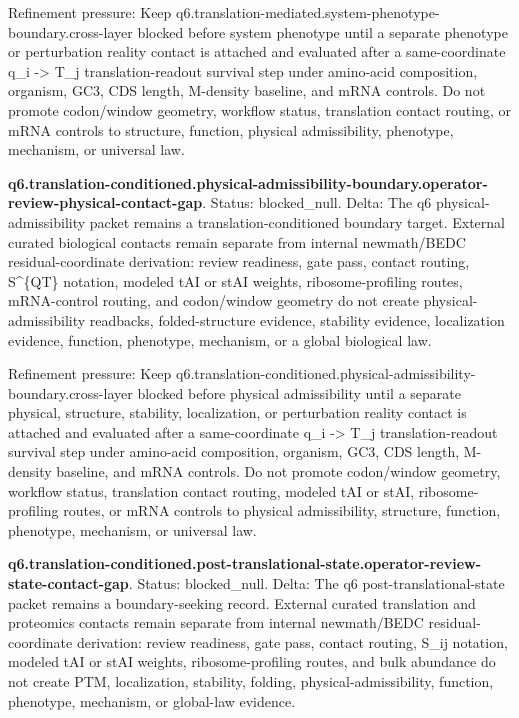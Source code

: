 Refinement pressure: Keep q6.translation-mediated.system-phenotype-boundary.cross-layer blocked before system phenotype until a separate phenotype or perturbation reality contact is attached and evaluated after a same-coordinate q\_i -> T\_j translation-readout survival step under amino-acid composition, organism, GC3, CDS length, M-density baseline, and mRNA controls. Do not promote codon/window geometry, workflow status, translation contact routing, or mRNA controls to structure, function, physical admissibility, phenotype, mechanism, or universal law.

\textbf{q6.translation-conditioned.physical-admissibility-boundary.operator-review-physical-contact-gap}. Status: blocked\_null. Delta: The q6 physical-admissibility packet remains a translation-conditioned boundary target. External curated biological contacts remain separate from internal newmath/BEDC residual-coordinate derivation: review readiness, gate pass, contact routing, S\textasciicircum{}\{QT\} notation, modeled tAI or stAI weights, ribosome-profiling routes, mRNA-control routing, and codon/window geometry do not create physical-admissibility readbacks, folded-structure evidence, stability evidence, localization evidence, function, phenotype, mechanism, or a global biological law.

Refinement pressure: Keep q6.translation-conditioned.physical-admissibility-boundary.cross-layer blocked before physical admissibility until a separate physical, structure, stability, localization, or perturbation reality contact is attached and evaluated after a same-coordinate q\_i -> T\_j translation-readout survival step under amino-acid composition, organism, GC3, CDS length, M-density baseline, and mRNA controls. Do not promote codon/window geometry, workflow status, translation contact routing, modeled tAI or stAI, ribosome-profiling routes, or mRNA controls to physical admissibility, structure, function, phenotype, mechanism, or universal law.

\textbf{q6.translation-conditioned.post-translational-state.operator-review-state-contact-gap}. Status: blocked\_null. Delta: The q6 post-translational-state packet remains a boundary-seeking record. External curated translation and proteomics contacts remain separate from internal newmath/BEDC residual-coordinate derivation: review readiness, gate pass, contact routing, S\_ij notation, modeled tAI or stAI weights, ribosome-profiling routes, and bulk abundance do not create PTM, localization, stability, folding, physical-admissibility, function, phenotype, mechanism, or global-law evidence.

